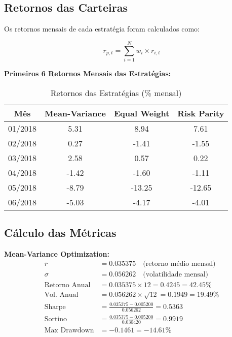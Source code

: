 \subsection{Retornos das Carteiras}

Os retornos mensais de cada estratégia foram calculados como:

\begin{equation}
r_{p,t} = \sum_{i=1}^{N} w_i \times r_{i,t}
\end{equation}

\textbf{Primeiros 6 Retornos Mensais das Estratégias:}

\begin{table}[H]
\centering
\caption{Retornos das Estratégias (\% mensal)}
\begin{tabular}{|c|c|c|c|}
\hline
\textbf{Mês} & \textbf{Mean-Variance} & \textbf{Equal Weight} & \textbf{Risk Parity} \\
\hline
01/2018 & 5.31 & 8.94 & 7.61 \\
02/2018 & 0.27 & -1.41 & -1.55 \\
03/2018 & 2.58 & 0.57 & 0.22 \\
04/2018 & -1.42 & -1.60 & -1.11 \\
05/2018 & -8.79 & -13.25 & -12.65 \\
06/2018 & -5.03 & -4.17 & -4.01 \\
\hline
\end{tabular}
\end{table}

\subsection{Cálculo das Métricas}

\textbf{Mean-Variance Optimization:}
\begin{align}
\bar{r} &= 0.035375 \quad \text{(retorno médio mensal)} \\
\sigma &= 0.056262 \quad \text{(volatilidade mensal)} \\
\text{Retorno Anual} &= 0.035375 \times 12 = 0.4245 = 42.45\% \\
\text{Vol. Anual} &= 0.056262 \times \sqrt{12} = 0.1949 = 19.49\% \\
\text{Sharpe} &= \frac{0.035375 - 0.005200}{0.056262} = 0.5363 \\
\text{Sortino} &= \frac{0.035375 - 0.005200}{0.030420} = 0.9919 \\
\text{Max Drawdown} &= -0.1461 = -14.61\%
\end{align}

